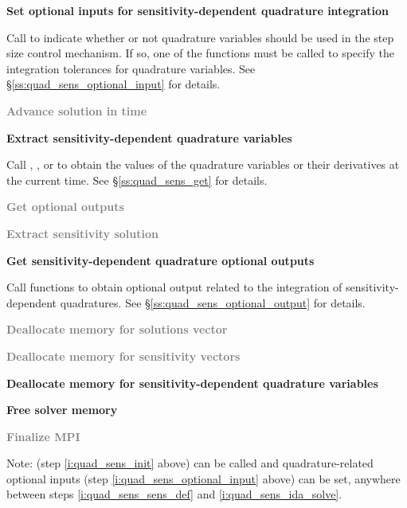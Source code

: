 \begin{Steps}
\item\label{i:quad_sens_optional_input}
  {\bf Set optional inputs for sensitivity-dependent quadrature integration}

  Call  to indicate whether or not quadrature variables
  should be used in the step size control mechanism. If so, one of the 
   functions  must be called to specify the integration 
  tolerances for quadrature variables.
  See \S\ref{ss:quad_sens_optional_input} for details.

\item\label{i:quad_sens_ida_solve}
  \textcolor{gray}{\bf Advance solution in time}

\item
  {\bf Extract sensitivity-dependent quadrature variables}

  Call , ,  or 
   to obtain the values of the quadrature variables or their 
  derivatives at the current time. See \S\ref{ss:quad_sens_get} for details.

\item
  \textcolor{gray}{\bf Get optional outputs}

\item
  \textcolor{gray}{\bf Extract sensitivity solution}

\item
  {\bf Get sensitivity-dependent quadrature optional outputs}

  Call  functions to obtain optional output related to
  the integration of sensitivity-dependent quadratures.
  See \S\ref{ss:quad_sens_optional_output} for details.

\item
  \textcolor{gray}{\bf Deallocate memory for solutions vector}

\item 
  \textcolor{gray}{\bf Deallocate memory for sensitivity vectors}

\item
  {\bf Deallocate memory for sensitivity-dependent quadrature variables}
  
\item
  {\bf Free solver memory}

\item 
  \textcolor{gray}{\bf {\p} Finalize MPI}
  
\end{Steps}
Note:  (step \ref{i:quad_sens_init} above) can be called and
quadrature-related optional inputs (step \ref{i:quad_sens_optional_input} above)
can be set, anywhere between steps \ref{i:quad_sens_sens_def} and
\ref{i:quad_sens_ida_solve}.

